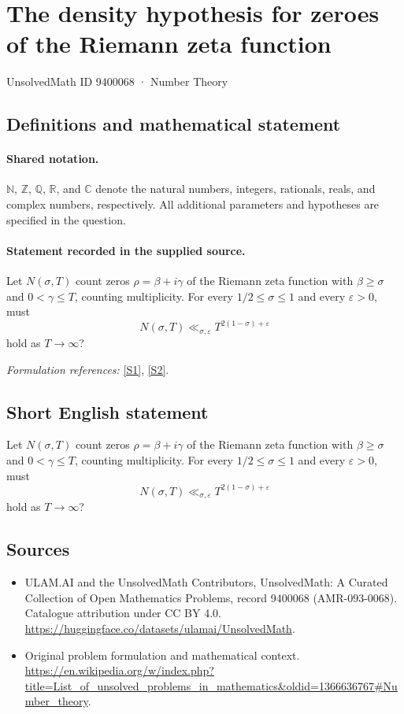 \documentclass[11pt]{article}
\newcommand{\sref}[2]{\hyperlink{source:#1:#2}{[S#2]}}
\begin{document}
\setcounter{section}{9400067}
\section{The density hypothesis for zeroes of the Riemann zeta function}\label{9400068}
{\small UnsolvedMath ID 9400068 · Number Theory}
\subsection{Definitions and mathematical statement}

\paragraph{Shared notation.}$\mathbb N$, $\mathbb Z$, $\mathbb Q$, $\mathbb R$, and $\mathbb C$ denote the natural numbers, integers, rationals, reals, and complex numbers, respectively. All additional parameters and hypotheses are specified in the question.


\paragraph{Statement recorded in the supplied source.}
Let $N(\sigma,T)$ count zeros $\rho=\beta+i\gamma$ of the Riemann zeta function with $\beta\geq\sigma$ and $0<\gamma\leq T$, counting multiplicity. For every $1/2\leq\sigma\leq1$ and every $\varepsilon>0$, must
\[N(\sigma,T)\ll_{\sigma,\varepsilon}T^{2(1-\sigma)+\varepsilon}\]
hold as $T\to\infty$?
\par\smallskip\textit{Formulation references:} \sref{9400068}{1}, \sref{9400068}{2}.
\subsection{Short English statement}
Let $N(\sigma,T)$ count zeros $\rho=\beta+i\gamma$ of the Riemann zeta function with $\beta\geq\sigma$ and $0<\gamma\leq T$, counting multiplicity. For every $1/2\leq\sigma\leq1$ and every $\varepsilon>0$, must
\[N(\sigma,T)\ll_{\sigma,\varepsilon}T^{2(1-\sigma)+\varepsilon}\]
hold as $T\to\infty$?
\subsection{Sources}
\begin{itemize}
\item[\hypertarget{source:9400068:1}{S1}] ULAM.AI and the UnsolvedMath Contributors, UnsolvedMath: A Curated Collection of Open Mathematics Problems, record 9400068 (AMR-093-0068). Catalogue attribution under CC BY 4.0.
\url{https://huggingface.co/datasets/ulamai/UnsolvedMath}.
\item[\hypertarget{source:9400068:2}{S2}] Original problem formulation and mathematical context.
\url{https://en.wikipedia.org/w/index.php?title=List_of_unsolved_problems_in_mathematics&oldid=1366636767#Number_theory}.
\end{itemize}
\label{end:9400068}
\end{document}
